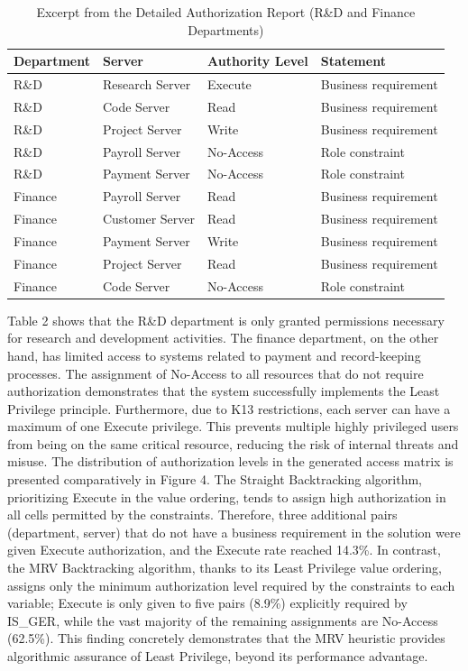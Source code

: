 \documentclass[conference]{IEEEtran}
\begin{document}
\begin{table}[htbp]
\caption{Excerpt from the Detailed Authorization Report (R\&D and Finance Departments)}
\centering
\small
\begin{tabular}{|p{1.3cm}|p{2.5cm}|p{1.7cm}|p{2cm}|}
\hline
\textbf{Department} & \textbf{Server} & \textbf{Authority Level} & \textbf{Statement} \\
\hline
R\&D & Research Server & Execute & Business requirement \\
\hline
R\&D & Code Server & Read & Business requirement \\
\hline
R\&D & Project Server & Write & Business requirement \\
\hline
R\&D & Payroll Server & No-Access & Role constraint \\
\hline
R\&D & Payment Server & No-Access & Role constraint \\
\hline
Finance & Payroll Server & Read & Business requirement \\
\hline
Finance & Customer Server & Read & Business requirement \\
\hline
Finance & Payment Server & Write & Business requirement \\
\hline
Finance & Project Server & Read & Business requirement \\
\hline
Finance & Code Server & No-Access & Role constraint \\
\hline
\end{tabular}
\label{tab:access_policies}
\end{table}Table 2 shows that the R\&D department is only granted permissions necessary for research and development activities. The finance department, on the other hand, has limited access to systems related to payment and record-keeping processes. The assignment of No-Access to all resources that do not require authorization demonstrates that the system successfully implements the Least Privilege principle. Furthermore, due to K13 restrictions, each server can have a maximum of one Execute privilege. This prevents multiple highly privileged users from being on the same critical resource, reducing the risk of internal threats and misuse.
The distribution of authorization levels in the generated access matrix is presented comparatively in Figure 4. The Straight Backtracking algorithm, prioritizing Execute in the value ordering, tends to assign high authorization in all cells permitted by the constraints. Therefore, three additional pairs (department, server) that do not have a business requirement in the solution were given Execute authorization, and the Execute rate reached 14.3\%. In contrast, the MRV Backtracking algorithm, thanks to its Least Privilege value ordering, assigns only the minimum authorization level required by the constraints to each variable; Execute is only given to five pairs (8.9\%) explicitly required by IS\_GER, while the vast majority of the remaining assignments are No-Access (62.5\%). This finding concretely demonstrates that the MRV heuristic provides algorithmic assurance of Least Privilege, beyond its performance advantage.
\end{document}
